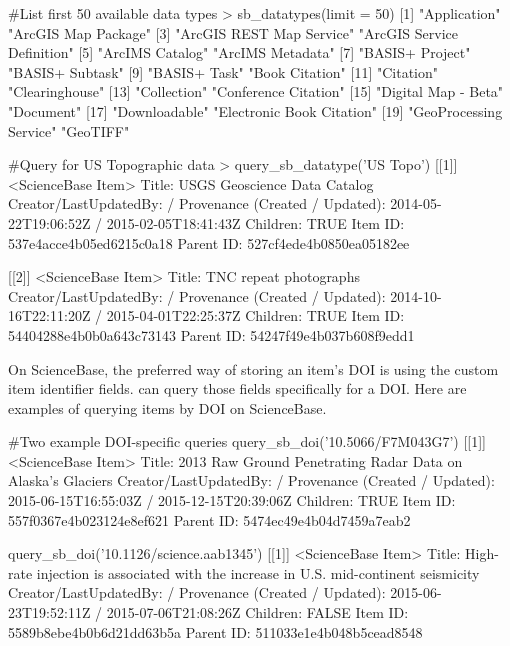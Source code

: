 \begin{example}
#List first 50 available data types
> sb_datatypes(limit = 50)
 [1] "Application"               "ArcGIS Map Package"       
 [3] "ArcGIS REST Map Service"   "ArcGIS Service Definition"
 [5] "ArcIMS Catalog"            "ArcIMS Metadata"          
 [7] "BASIS+ Project"            "BASIS+ Subtask"           
 [9] "BASIS+ Task"               "Book Citation"            
[11] "Citation"                  "Clearinghouse"            
[13] "Collection"                "Conference Citation"      
[15] "Digital Map - Beta"        "Document"                 
[17] "Downloadable"              "Electronic Book Citation" 
[19] "GeoProcessing Service"     "GeoTIFF"  


#Query for US Topographic data
> query_sb_datatype('US Topo')
[[1]]
<ScienceBase Item>
  Title: USGS Geoscience Data Catalog
  Creator/LastUpdatedBy:      /
  Provenance (Created / Updated):  2014-05-22T19:06:52Z / 2015-02-05T18:41:43Z
  Children: TRUE
  Item ID: 537e4acce4b05ed6215c0a18
  Parent ID: 527cf4ede4b0850ea05182ee

[[2]]
<ScienceBase Item>
  Title: TNC repeat photographs
  Creator/LastUpdatedBy:      /
  Provenance (Created / Updated):  2014-10-16T22:11:20Z / 2015-04-01T22:25:37Z
  Children: TRUE
  Item ID: 54404288e4b0b0a643c73143
  Parent ID: 54247f49e4b037b608f9edd1
\end{example}


On ScienceBase, the preferred way of storing an item's DOI is using the custom item
identifier fields.  can query those fields specifically for
a DOI. Here are examples of querying items by DOI on ScienceBase.

\begin{example}
#Two example DOI-specific queries
query_sb_doi('10.5066/F7M043G7')
[[1]]
<ScienceBase Item>
  Title: 2013 Raw Ground Penetrating Radar Data on Alaska's Glaciers
  Creator/LastUpdatedBy:      /
  Provenance (Created / Updated):  2015-06-15T16:55:03Z / 2015-12-15T20:39:06Z
  Children: TRUE
  Item ID: 557f0367e4b023124e8ef621
  Parent ID: 5474ec49e4b04d7459a7eab2

query_sb_doi('10.1126/science.aab1345')
[[1]]
<ScienceBase Item>
  Title: High-rate injection is associated with the increase in U.S. mid-continent seismicity
  Creator/LastUpdatedBy:      /
  Provenance (Created / Updated):  2015-06-23T19:52:11Z / 2015-07-06T21:08:26Z
  Children: FALSE
  Item ID: 5589b8ebe4b0b6d21dd63b5a
  Parent ID: 511033e1e4b048b5cead8548
\end{example}

